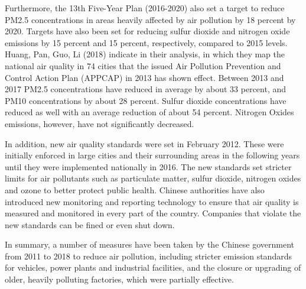 \documentclass[
]{article}
\begin{document}
	Furthermore, the 13th Five-Year Plan (2016-2020) also set a target to reduce PM2.5 concentrations in areas heavily affected by air pollution by 18 percent by 2020. Targets have also been set for reducing sulfur dioxide and nitrogen oxide emissions by 15 percent and 15 percent, respectively, compared to 2015 levels. %
	Huang, Pan, Guo, Li (2018) indicate in their analysis, in which they map the national air quality in 74 cities that the issued Air Pollution Prevention and Control Action Plan (APPCAP) in 2013 has shown effect. Between 2013 and 2017 PM2.5 concentrations have reduced in average by about 33 percent, and PM10 concentrations by about 28 percent. Sulfur dioxide concentrations have reduced as well with an average reduction of about 54 percent. Nitrogen Oxides emissions, however, have not significantly decreased. %
	
	In addition, new air quality standards were set in February 2012. These were initially enforced in large cities and their surrounding areas in the following years until they were implemented nationally in 2016. The new standards set stricter limits for air pollutants such as particulate matter, sulfur dioxide, nitrogen oxides and ozone to better protect public health. Chinese authorities have also introduced new monitoring and reporting technology to ensure that air quality is measured and monitored in every part of the country. Companies that violate the new standards can be fined or even shut down. %
	
	In summary, a number of measures have been taken by the Chinese government from 2011 to 2018 to reduce air pollution, including stricter emission standards for vehicles, power plants and industrial facilities, and the closure or upgrading of older, heavily polluting factories, which were partially effective. %
	
	
\end{document}
